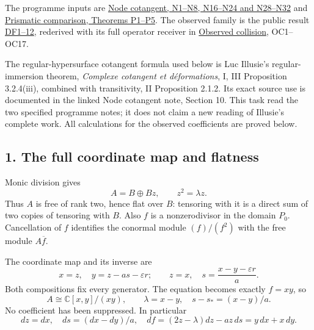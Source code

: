 \documentclass[
]{article}
\begin{document}
The programme inputs are
\href{https://github.com/KokunoYumeto/zeta-function-research-reader/blob/6af54ea3c8ef99127af327f3103e086c68d482c2/workbenches/splitzero-tandem/branches/identity-absorber-square/NODE_COTANGENT.md}{Node
cotangent, N1--N8, N16--N24 and N28--N32} and
\href{https://github.com/KokunoYumeto/zeta-function-research-reader/blob/6af54ea3c8ef99127af327f3103e086c68d482c2/workbenches/splitzero-tandem/branches/identity-absorber-square/PRISMATIC_COMPARISON.md}{Prismatic
comparison, Theorems P1--P5}. The observed family is the public result
\href{https://github.com/KokunoYumeto/zeta-function-research-reader/blob/4ba9285b66af58a6d58fc502a494c1fb45ca5b79/workbenches/splitzero-tandem/continuations/20260922-support-transport/OBSERVED_DEFORMATION_AND_CURRENT.md\#L22}{DF1--12},
rederived with its full operator receiver in
\href{https://github.com/KokunoYumeto/zeta-function-research-reader/blob/c9df443d9e1df000dfbb083943f97197e746eb08/workbenches/splitzero-tandem/branches/identity-absorber-square/OBSERVED_COLLISION.md}{Observed
collision}, OC1--OC17.

The regular-hypersurface cotangent formula used below is Luc Illusie's
regular-immersion theorem, \emph{Complexe cotangent et déformations}, I,
III Proposition 3.2.4(iii), combined with transitivity, II Proposition
2.1.2. Its exact source use is documented in the linked Node cotangent
note, Section 10. This task read the two specified programme notes; it
does not claim a new reading of Illusie's complete work. All
calculations for the observed coefficients are proved below.

\subsection{1. The full coordinate map and
flatness}\label{the-full-coordinate-map-and-flatness}

Monic division gives \[
A=B\oplus Bz,\qquad z^2=\lambda z.
\tag{OCF3}
\] Thus \(A\) is free of rank two, hence flat over \(B\): tensoring with
it is a direct sum of two copies of tensoring with \(B\). Also \(f\) is
a nonzerodivisor in the domain \(P_0\). Cancellation of \(f\) identifies
the conormal module \((f)/(f^2)\) with the free module \(A\overline f\).

The coordinate map and its inverse are \[
x=z,\quad y=z-as-\varepsilon r;
\qquad z=x,\quad s=\frac{x-y-\varepsilon r}{a}.
\tag{OCF4}
\] Both compositions fix every generator. The equation becomes exactly
\(f=xy\), so \[
A\cong\mathbb C[x,y]/(xy),\qquad
\lambda=x-y,\quad s-s_*=(x-y)/a.
\tag{OCF5}
\] No coefficient has been suppressed. In particular \[
dz=dx,\quad ds=(dx-dy)/a,\quad
df=(2z-\lambda)dz-az\,ds=y\,dx+x\,dy.
\tag{OCF6}
\]
\end{document}
